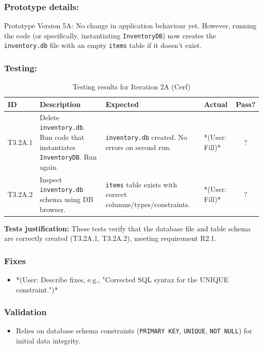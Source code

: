 \subsubsection{Prototype details:}
Prototype Version 5A: No change in application behaviour yet. However, running the code (or specifically, instantiating \verb|InventoryDB|) now creates the \verb|inventory.db| file with an empty \verb|items| table if it doesn't exist.

\subsubsection{Testing:}
\begin{table}[htbp]
	\centering
	\begin{tabularx}{\textwidth}{|l|X|p{4.5cm}|p{1.5cm}|c|}
		\hline
		\textbf{ID} & \textbf{Description} & \textbf{Expected} & \textbf{Actual} & \textbf{Pass?} \\
		\hline
		T3.2A.1 & Delete \verb|inventory.db|. Run code that instantiates \verb|InventoryDB|. Run again. & \verb|inventory.db| created. No errors on second run. & *(User: Fill)* & ? \\
		\hline
		T3.2A.2 & Inspect \verb|inventory.db| schema using DB browser. & \verb|items| table exists with correct columns/types/constraints. & *(User: Fill)* & ? \\
		\hline
	\end{tabularx}
	\caption{Testing results for Iteration 2A (Cerf)}
\end{table}
\textbf{Tests justification:} These tests verify that the database file and table schema are correctly created (T3.2A.1, T3.2A.2), meeting requirement R2.1.

\subsubsection{Fixes}
\begin{itemize}
	\item *(User: Describe fixes, e.g., "Corrected SQL syntax for the UNIQUE constraint.")*
\end{itemize}

\subsubsection{Validation}
\begin{itemize}
	\item Relies on database schema constraints (\verb|PRIMARY KEY|, \verb|UNIQUE|, \verb|NOT NULL|) for initial data integrity.
\end{itemize}

